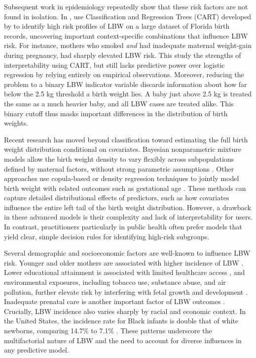 Subsequent work in epidemiology repeatedly show that these risk factors are not found in isolation. In \citeyear{KITSANTAS2006275}, \textcite{KITSANTAS2006275} use Classification and Regression Trees (CART) developed by \textcite{breiman1984classification} to identify high risk profiles of LBW on a large dataset of Florida birth records, uncovering important context-specific combinations that influence LBW risk. For instance, mothers who smoked \emph{and} had inadequate maternal weight-gain during pregnancy, had sharply elevated LBW risk. This study the strengths of interpretability using CART, but still lacks predictive power over logistic regression by relying entirely on empirical observations. Moreover, reducing the problem to a binary LBW indicator variable discards information about how far below the 2.5 kg threshold a birth weight lies. A baby just above 2.5 kg is treated the same as a much heavier baby, and all LBW cases are treated alike. This binary cutoff thus masks important differences in the distribution of birth weights.

Recent research has moved beyond classification toward estimating the full birth weight distribution conditional on covariates. Bayesian nonparametric mixture models allow the birth weight density to vary flexibly across subpopulations defined by maternal factors, without strong parametric assumptions \parencite{dunson2008}. Other approaches use copula-based or density regression techniques to jointly model birth weight with related outcomes such as gestational age \parencite{rathjens2023}. These methods can capture detailed distributional effects of predictors, such as how covariates influence the entire left tail of the birth weight distribution. However, a drawback in these advanced models is their complexity and lack of interpretability for users. In contrast, practitioners particularly in public health often prefer models that yield clear, simple decision rules for identifying high-risk subgroups. 

Several demographic and socioeconomic factors are well-known to influence LBW risk. Younger and older mothers are associated with higher incidence of LBW \parencite{age_differences_lbw}. Lower educational attainment is associated with limited healthcare access \parencite{finch2003,jain2024}, and environmental exposures, including tobacco use, substance abuse, and air pollution, further elevate risk by interfering with fetal growth and development \parencite{standford_med_lbw, lu2020combined}. Inadequate prenatal care is another important factor of LBW outcomes \parencite{prenatal_lbw}. Crucially, LBW incidence also varies sharply by racial and economic context. In the United States, the incidence rate for Black infants is double that of white newborns, comparing 14.7\% to 7.1\%  \parencite{marchofdimes2024}. These patterns underscore the multifactorial nature of LBW and the need to account for diverse influences in any predictive model. 

